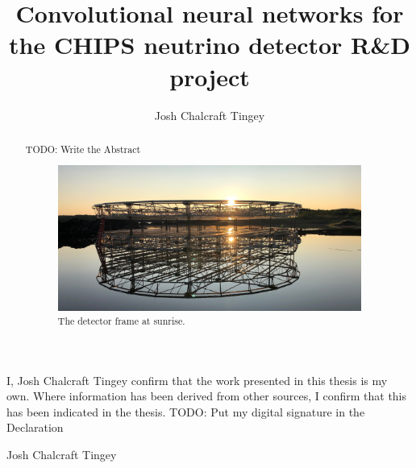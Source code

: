 
\title{Convolutional neural networks for the CHIPS neutrino detector R\&D project}
\author{Josh Chalcraft Tingey}

\thispagestyle{plain}

\begin{declaration} %
    I, Josh Chalcraft Tingey confirm that the work presented in this thesis is my own. Where
    information has been derived from other sources, I confirm that this has been indicated in the
    thesis.
    TODO: Put my digital signature in the Declaration
    \vspace*{1cm}
    \begin{flushright}
        Josh Chalcraft Tingey
    \end{flushright}
\end{declaration}

\begin{abstract} %
    TODO: Write the Abstract

    \begin{figure} %
        \includegraphics[width=\textwidth]{diagrams/4-chips/sunrise_short.jpeg}
        \caption*{The \chipsfive detector frame at sunrise.}
    \end{figure}

\end{abstract}

